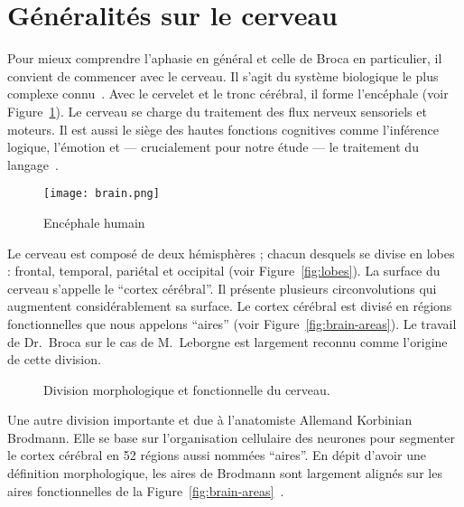\section{Généralités sur le cerveau}

Pour mieux comprendre l'aphasie en général et celle de Broca en particulier, 
il convient de commencer avec le cerveau.
Il s'agit du système biologique le plus complexe connu~\cite{}.
Avec le cervelet et le tronc cérébral, il forme l'encéphale (voir Figure~\ref{fig:brain}).
Le cerveau se charge du traitement des flux nerveux sensoriels et moteurs.
Il est aussi le siège des hautes fonctions cognitives comme l'inférence logique, l'émotion 
et --- crucialement pour notre étude --- le traitement du langage~\cite{}.

\begin{figure}[htb]
    \begin{center}
        \texttt{[image: brain.png]}
    \end{center}
    \caption{Encéphale humain}
    \label{fig:brain}
\end{figure}

Le cerveau est composé de deux hémisphères ; chacun desquels se divise en lobes : 
frontal, temporal, pariétal et occipital (voir Figure~\ref{fig:lobes}).
La surface du cerveau s'appelle le ``cortex cérébral''.
Il présente plusieurs circonvolutions qui augmentent considérablement sa surface.
Le cortex cérébral est divisé en régions fonctionnelles que nous appelons ``aires''
(voir Figure~\ref{fig:brain-areas}).
Le travail de Dr.~Broca sur le cas de M.~Leborgne est largement reconnu comme l'origine de cette division.


\begin{figure}[htb]
    \begin{center}
    \end{center}
    \caption{Division morphologique et fonctionnelle du cerveau.}
\end{figure}

Une autre division importante et due à l'anatomiste Allemand Korbinian Brodmann.
Elle se base sur l'organisation cellulaire des neurones pour segmenter le cortex cérébral en 52 régions 
aussi nommées ``aires''.
En dépit d'avoir une définition morphologique, 
les aires de Brodmann sont largement alignés sur les aires fonctionnelles 
de la Figure~\ref{fig:brain-areas}~\cite{Brodmann_2007}.

